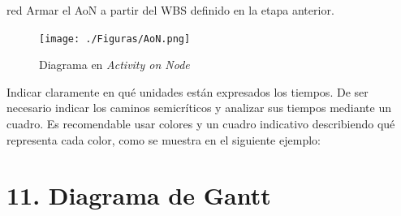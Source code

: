 \documentclass[
11pt, %
codirector, %
]{charter}
\begin{document}
\begin{consigna}{red}
Armar el AoN a partir del WBS definido en la etapa anterior. 



\end{consigna}

\begin{figure}[htpb]
\centering 
\texttt{[image: ./Figuras/AoN.png]}
\caption{Diagrama en \textit{Activity on Node}}
\label{fig:AoN}
\end{figure}

Indicar claramente en qué unidades están expresados los tiempos.
De ser necesario indicar los caminos semicríticos y analizar sus tiempos mediante un cuadro.
Es recomendable usar colores y un cuadro indicativo describiendo qué representa cada color, como se muestra en el siguiente ejemplo:



\section{11. Diagrama de Gantt}
\label{sec:gantt}
\end{document}
